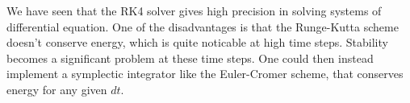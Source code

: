 
We have seen that the RK4 solver gives high precision in solving systems of
differential equation. One of the disadvantages is that the Runge-Kutta scheme
doesn't conserve energy, which is quite noticable at high time steps. Stability
becomes a significant problem at these time steps. One could
then instead implement a symplectic integrator like the Euler-Cromer scheme,
that conserves energy for any given $dt$. 
